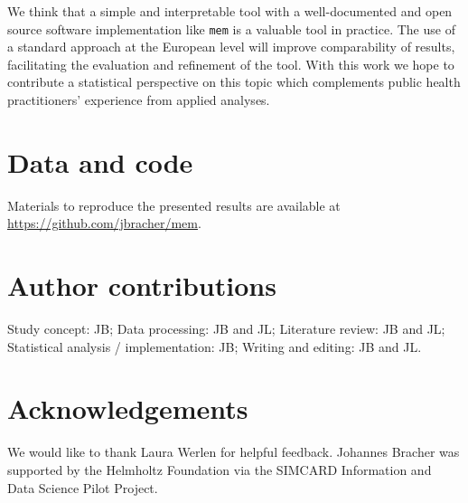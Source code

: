 \documentclass{article}
\begin{document}

We think that a simple and interpretable tool with a well-documented and open source software implementation like \texttt{mem} is a valuable tool in practice. The use of a standard approach at the European level will improve comparability of results, facilitating the evaluation and refinement of the tool. With this work we hope to contribute a statistical perspective on this topic which complements public health practitioners' experience from applied analyses.


\section*{Data and code}

Materials to reproduce the presented results are available at \url{https://github.com/jbracher/mem}.

\section*{Author contributions}

Study concept: JB; Data processing: JB and JL; Literature review: JB and JL; Statistical analysis / implementation: JB; Writing and editing: JB and JL.


\section*{Acknowledgements}

We would like to thank Laura Werlen for helpful feedback. Johannes Bracher was supported by the Helmholtz Foundation via the SIMCARD Information and Data Science Pilot Project.



\end{document}
